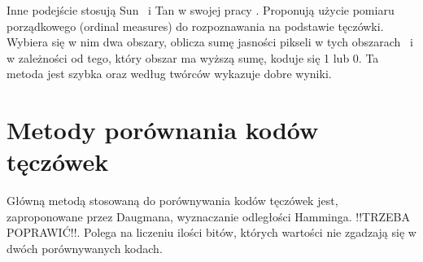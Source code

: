 Inne podejście stosują Sun ~i Tan w swojej pracy \cite{TaSu09}. Proponują użycie pomiaru porządkowego (ordinal measures) do rozpoznawania na podstawie tęczówki. Wybiera się w nim dwa obszary, oblicza sumę jasności pikseli w tych obszarach ~i w zależności od tego, który obszar ma wyższą sumę, koduje się 1 lub 0. Ta metoda jest szybka oraz według twórców wykazuje dobre wyniki.

\section{Metody porównania kodów tęczówek}
\label{sec:metodyPorownaniaKodow}
Główną metodą stosowaną do porównywania kodów tęczówek jest, zaproponowane przez Daugmana, wyznaczanie odległości Hamminga. !!TRZEBA POPRAWIĆ!!. Polega na liczeniu ilości bitów, których wartości nie zgadzają się w dwóch porównywanych kodach.
